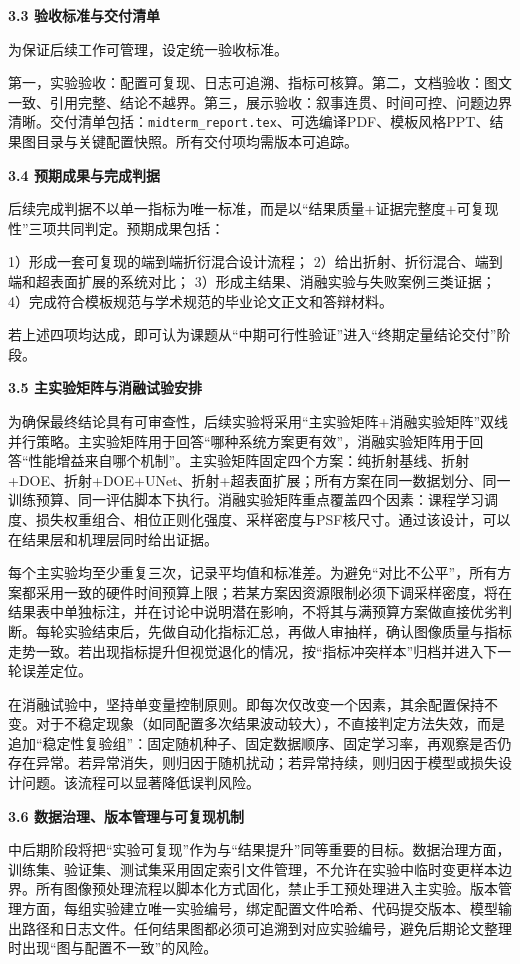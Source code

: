 \documentclass[UTF8,12pt,fontset=fandol]{ctexart}
\newcommand{\hfirst}[1]{%
\vspace{0.6em}
\noindent\textbf{#1}\par
}
\begin{document}
\hfirst{3.3 验收标准与交付清单}
为保证后续工作可管理，设定统一验收标准。

第一，实验验收：配置可复现、日志可追溯、指标可核算。第二，文档验收：图文一致、引用完整、结论不越界。第三，展示验收：叙事连贯、时间可控、问题边界清晰。交付清单包括：\texttt{midterm\_report.tex}、可选编译PDF、模板风格PPT、结果图目录与关键配置快照。所有交付项均需版本可追踪。

\hfirst{3.4 预期成果与完成判据}
后续完成判据不以单一指标为唯一标准，而是以“结果质量+证据完整度+可复现性”三项共同判定。预期成果包括：

1）形成一套可复现的端到端折衍混合设计流程；
2）给出折射、折衍混合、端到端和超表面扩展的系统对比；
3）形成主结果、消融实验与失败案例三类证据；
4）完成符合模板规范与学术规范的毕业论文正文和答辩材料。

若上述四项均达成，即可认为课题从“中期可行性验证”进入“终期定量结论交付”阶段。

\hfirst{3.5 主实验矩阵与消融试验安排}
为确保最终结论具有可审查性，后续实验将采用“主实验矩阵+消融实验矩阵”双线并行策略。主实验矩阵用于回答“哪种系统方案更有效”，消融实验矩阵用于回答“性能增益来自哪个机制”。主实验矩阵固定四个方案：纯折射基线、折射+DOE、折射+DOE+UNet、折射+超表面扩展；所有方案在同一数据划分、同一训练预算、同一评估脚本下执行。消融实验矩阵重点覆盖四个因素：课程学习调度、损失权重组合、相位正则化强度、采样密度与PSF核尺寸。通过该设计，可以在结果层和机理层同时给出证据。

每个主实验均至少重复三次，记录平均值和标准差。为避免“对比不公平”，所有方案都采用一致的硬件时间预算上限；若某方案因资源限制必须下调采样密度，将在结果表中单独标注，并在讨论中说明潜在影响，不将其与满预算方案做直接优劣判断。每轮实验结束后，先做自动化指标汇总，再做人审抽样，确认图像质量与指标走势一致。若出现指标提升但视觉退化的情况，按“指标冲突样本”归档并进入下一轮误差定位。

在消融试验中，坚持单变量控制原则。即每次仅改变一个因素，其余配置保持不变。对于不稳定现象（如同配置多次结果波动较大），不直接判定方法失效，而是追加“稳定性复验组”：固定随机种子、固定数据顺序、固定学习率，再观察是否仍存在异常。若异常消失，则归因于随机扰动；若异常持续，则归因于模型或损失设计问题。该流程可以显著降低误判风险。

\hfirst{3.6 数据治理、版本管理与可复现机制}
中后期阶段将把“实验可复现”作为与“结果提升”同等重要的目标。数据治理方面，训练集、验证集、测试集采用固定索引文件管理，不允许在实验中临时变更样本边界。所有图像预处理流程以脚本化方式固化，禁止手工预处理进入主实验。版本管理方面，每组实验建立唯一实验编号，绑定配置文件哈希、代码提交版本、模型输出路径和日志文件。任何结果图都必须可追溯到对应实验编号，避免后期论文整理时出现“图与配置不一致”的风险。
\end{document}
